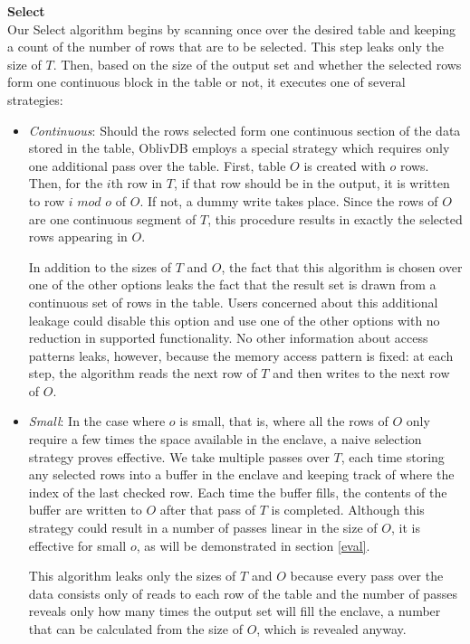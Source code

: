 \documentclass[USenglish,oneside,twocolumn]{article}
\def\name/{OblivDB}
\begin{document}
\medskip \noindent \textbf{Select}\\
Our Select algorithm begins by scanning once over the desired table and keeping a count of the number of rows that are to be selected. This step leaks only the size of $T$. Then, based on the size of the output set and whether the selected rows form one continuous block in the table or not, it executes one of several strategies:
\begin{itemize}
\item \textit{Continuous}: Should the rows selected form one continuous section of the data stored in the table, \name/ employs a special strategy which requires only one additional pass over the table. First, table $O$ is created with $o$ rows. Then, for the $i$th row in $T$, if that row should be in the output, it is written to row $i\textit{ mod }o$ of $O$. If not, a dummy write takes place. Since the rows of $O$ are one continuous segment of $T$, this procedure results in exactly the selected rows appearing in $O$. 

In addition to the sizes of $T$ and $O$, the fact that this algorithm is chosen over one of the other options leaks the fact that the result set is drawn from a continuous set of rows in the table. Users concerned about this additional leakage could disable this option and use one of the other options with no reduction in supported functionality. No other information about access patterns leaks, however, because the memory access pattern is fixed: at each step, the algorithm reads the next row of $T$ and then writes to the next row of $O$. 

\item \textit{Small}: In the case where $o$ is small, that is, where all the rows of $O$ only require a few times the space available in the enclave, a naive selection strategy proves effective. We take multiple passes over $T$, each time storing any selected rows into a buffer in the enclave and keeping track of where the index of the last checked row. Each time the buffer fills, the contents of the buffer are written to $O$ after that pass of $T$ is completed. Although this strategy could result in a number of passes linear in the size of $O$, it is effective for small $o$, as will be demonstrated in section \ref{eval}.

This algorithm leaks only the sizes of $T$ and $O$ because every pass over the data consists only of reads to each row of the table and the number of passes reveals only how many times the output set will fill the enclave, a number that can be calculated from the size of $O$, which is revealed anyway. 


\end{itemize}
\end{document}
